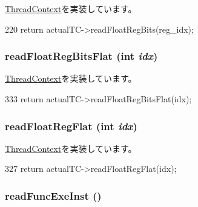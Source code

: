 \hyperlink{classThreadContext_a66bf9e1bf11ad15d1903209dd37014c5}{ThreadContext}を実装しています。


\begin{DoxyCode}
220     { return actualTC->readFloatRegBits(reg_idx); }
\end{DoxyCode}
\hypertarget{classCheckerThreadContext_a2fa29585c9694c9bffcce2a63f871759}{
\subsubsection[{readFloatRegBitsFlat}]{ readFloatRegBitsFlat (int {\em idx})}}
\label{classCheckerThreadContext_a2fa29585c9694c9bffcce2a63f871759}


\hyperlink{classThreadContext_a3715f0deff5e4aeb64a8cf3ca293068b}{ThreadContext}を実装しています。


\begin{DoxyCode}
333     { return actualTC->readFloatRegBitsFlat(idx); }
\end{DoxyCode}
\hypertarget{classCheckerThreadContext_aaa32dc9f4a8719a465c267fed47cbdc6}{
\subsubsection[{readFloatRegFlat}]{ readFloatRegFlat (int {\em idx})}}
\label{classCheckerThreadContext_aaa32dc9f4a8719a465c267fed47cbdc6}


\hyperlink{classThreadContext_a275e2481d9069a0ae8142fb7cc901cbf}{ThreadContext}を実装しています。


\begin{DoxyCode}
327     { return actualTC->readFloatRegFlat(idx); }
\end{DoxyCode}
\hypertarget{classCheckerThreadContext_a2b0bef6e1b1ac24e9322fbd09a511d11}{
\subsubsection[{readFuncExeInst}]{ readFuncExeInst ()}}
\label{classCheckerThreadContext_a2b0bef6e1b1ac24e9322fbd09a511d11}


